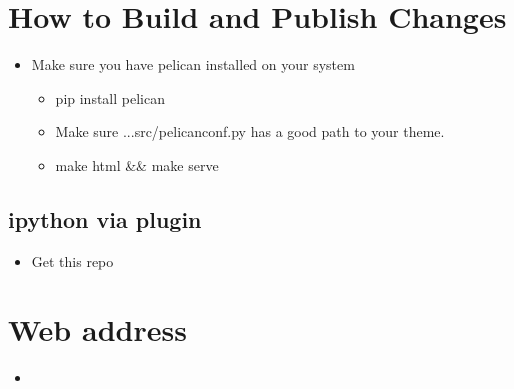 \documentclass[10pt,letterpaper]{report}
\author{Luke McCulloch}
\begin{document}
\section{How to Build and Publish Changes}
	\begin{itemize}
		\item  Make sure you have pelican installed on your system
		\begin{itemize}
			\item pip install pelican
			\item Make sure ...src/pelicanconf.py has a good path to your theme.
			\item make html \&\& make serve
		\end{itemize}
	\end{itemize}
	
	\subsection{ipython via plugin}
		\begin{itemize}
			\item Get this repo 
		\end{itemize}
	
\section{Web address}
	\begin{itemize}
		\item  {}
	\end{itemize}
\end{document}
